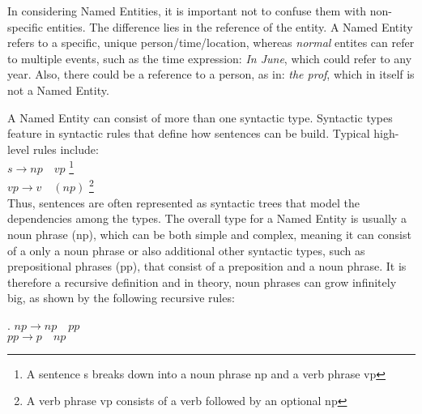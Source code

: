 \documentclass[11pt]{article}
\newcommand{\namedentity}{Named Entity}
\begin{document}
In considering Named Entities, it is important not to confuse them with non-specific entities. %
The difference lies in the reference of the entity. A Named Entity refers to a specific, unique person/time/location, whereas
\emph{normal} entites can refer to multiple events, such as the time expression: \emph{In June}, which could refer to any year.
Also, there could be a reference to a person, as in: \emph{the prof}, which in itself is not a \namedentity.

A Named Entity  can consist of more than one syntactic type. Syntactic types feature in syntactic rules that define how sentences can be build.
Typical high-level rules include: \\
$s \rightarrow np\quad vp $ \footnote{ A sentence s breaks down into a noun phrase np and a verb phrase vp} \\
$ vp \rightarrow v\quad (np)$ \footnote{ A verb phrase vp consists of a verb followed by an optional np} \\

Thus, sentences are often represented as syntactic trees that model the dependencies among the types.
The overall type for a Named Entity is usually a noun phrase (np), which can be both simple and complex, meaning it can consist of a only a noun phrase or 
also additional other syntactic types, such as prepositional phrases (pp), that consist of a preposition and a noun phrase. 
It is therefore a recursive definition and in theory, noun phrases can grow infinitely big, as shown by the following recursive rules:  %

\ex. $ np \rightarrow np \quad pp$ \\
     $ pp \rightarrow p \quad np$ 
 
\end{document}
